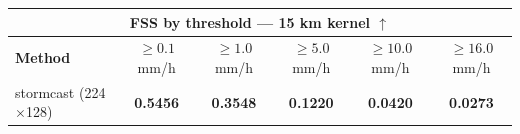 \documentclass[border=10pt]{standalone}
\begin{document}
\begin{tabular}{lccccc}
\toprule
\multicolumn{6}{c}{\textbf{FSS by threshold — 15 km kernel} $\uparrow$} \\
\midrule
\textbf{Method} & $\geq 0.1$ mm/h & $\geq 1.0$ mm/h & $\geq 5.0$ mm/h & $\geq 10.0$ mm/h & $\geq 16.0$ mm/h \\
\midrule
stormcast (224$\times$128) & \textbf{0.5456} & \textbf{0.3548} & \textbf{0.1220} & \textbf{0.0420} & \textbf{0.0273} \\
\bottomrule
\end{tabular}
\end{document}
